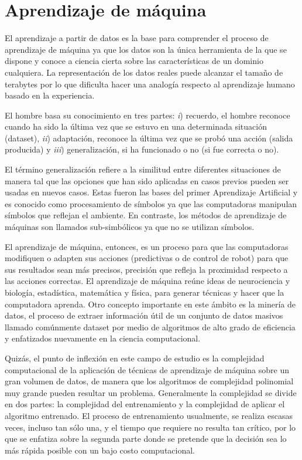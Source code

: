 \section{Aprendizaje de máquina \label{sec:Aprendizaje-de-maquina}}

El aprendizaje a partir de datos es la base para comprender el proceso
de aprendizaje de máquina ya que los datos son la única herramienta
de la que se dispone y conoce a ciencia cierta sobre las características
de un dominio cualquiera. La representación de los datos reales puede
alcanzar el tamaño de terabytes por lo que dificulta hacer una analogía
respecto al aprendizaje humano basado en la experiencia. 

El hombre basa su conocimiento en tres partes: \emph{i}) recuerdo,
el hombre reconoce cuando ha sido la última vez que se estuvo en una
determinada situación (dataset), \emph{ii}) adaptación, reconoce la
última vez que se probó una acción (salida producida) y \emph{iii})
generalización, si ha funcionado o no (si fue correcta o no). 

El término generalización refiere a la similitud entre diferentes
situaciones de manera tal que las opciones que han sido aplicadas
en casos previos pueden ser usadas en nuevos casos. Estas fueron las
bases del primer Aprendizaje Artificial y es conocido como procesamiento
de símbolos ya que las computadoras manipulan símbolos que reflejan
el ambiente. En contraste, los métodos de aprendizaje de máquinas
son llamados sub-simbólicos ya que no se utilizan símbolos. 

El aprendizaje de máquina, entonces, es un proceso para que las computadoras
modifiquen o adapten sus acciones (predictivas o de control de robot)
para que sus resultados sean más precisos, precisión que refleja la
proximidad respecto a las acciones correctas. El aprendizaje de máquina
reúne ideas de neurociencia y biología, estadística, matemática y
física, para generar técnicas y hacer que la computadora aprenda.
Otro concepto importante en este ámbito es la minería de datos, el
proceso de extraer información útil de un conjunto de datos masivos
llamado comúnmente dataset por medio de algoritmos de alto grado de
eficiencia y enfatizados nuevamente en la ciencia computacional. 

Quizás, el punto de inflexión en este campo de estudio es la complejidad
computacional de la aplicación de técnicas de aprendizaje de máquina
sobre un gran volumen de datos, de manera que los algoritmos de complejidad
polinomial muy grande pueden resultar un problema. Generalmente la
complejidad se divide en dos partes: la complejidad del entrenamiento
y la complejidad de aplicar el algoritmo entrenado. El proceso de
entrenamiento usualmente, se realiza escasas veces, incluso tan sólo
una, y el tiempo que requiere no resulta tan crítico, por lo que se
enfatiza sobre la segunda parte donde se pretende que la decisión
sea lo más rápida posible con un bajo costo computacional. 

